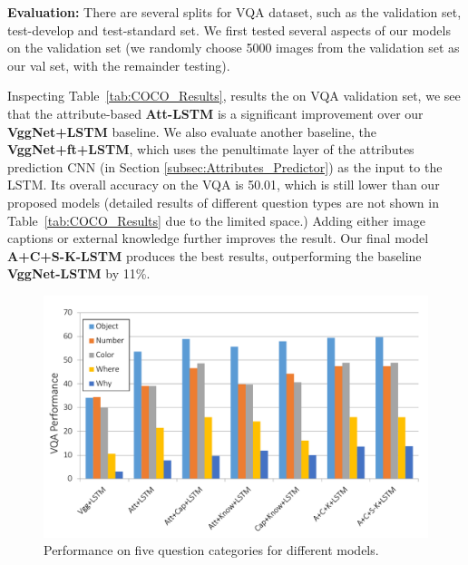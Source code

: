 \vspace{3pt}
\noindent\textbf{Evaluation:} There are several splits for VQA dataset, such as the validation set, test-develop and test-standard set. We first tested several aspects of our models on the validation set (we randomly choose 5000 images from the validation set as our val set, with the remainder testing). %

Inspecting Table~\ref{tab:COCO_Results}, results the on VQA validation set, we see that the attribute-based \textbf{Att-LSTM} is a significant improvement over our \textbf{VggNet+LSTM} baseline. We also evaluate another baseline, the \textbf{VggNet+ft+LSTM}, which uses the penultimate layer of the attributes prediction CNN (in Section \ref{subsec:Attributes_Predictor}) as the input to the LSTM. Its overall accuracy on the VQA is 50.01, which is still lower than our proposed models (detailed results of different question types are not shown in Table~\ref{tab:COCO_Results} due to the limited space.) Adding either image captions or external knowledge further improves the result. Our final model \textbf{A+C+S-K-LSTM} produces the best results, outperforming the baseline \textbf{VggNet-LSTM} by 11\%. %

\begin{figure}[b!]
\vspace{-10pt}
\begin{center}
   \includegraphics[width=0.9\linewidth]{img/question_cat.pdf}
\end{center}
\vspace{-13pt}
   \caption{Performance on five question categories for different models.}
%
\label{performance_trend}
\end{figure}

